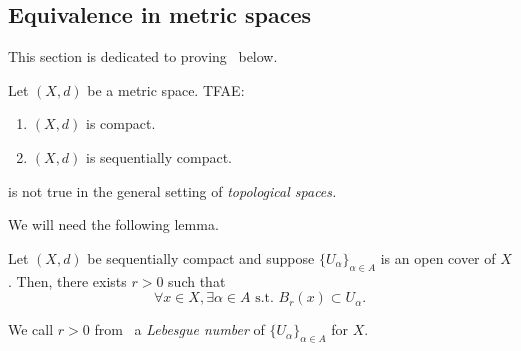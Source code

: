 \subsection{Equivalence in metric spaces}
\label{sec:cpct_seq}
This section is dedicated to proving~ below.
\begin{thm}
\label{thm:cpct_equiv}
Let $(X,d)$ be a metric space. TFAE:
\begin{enumerate}
	\item \label{cpct_equiv_1} $(X,d)$ is compact.
	\item \label{cpct_equiv_2} $(X,d)$ is sequentially compact.
\end{enumerate}
\end{thm}
\begin{rem}
	 is not true in the general setting of \textit{topological spaces.}
\end{rem}
We will need the following lemma.
\begin{lemma}
	\label{lem:Lebesgue_number}
	Let $(X,d)$ be sequentially compact and suppose $\{U_\alpha\}_{\alpha \in A}$ is an open cover of $X$. Then, there exists $r>0$ such that
	\[
	\forall x \in X,\exists \alpha \in A\text{ s.t. }B_r(x)\subset U_\alpha.
	\]
\end{lemma}
We call $r>0$ from~ a \textit{Lebesgue number} of $\{U_\alpha\}_{\alpha \in A}$ for $X$.
